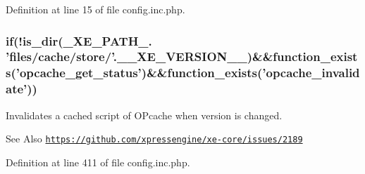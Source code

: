 Definition at line 15 of file config.\-inc.\-php.

\hypertarget{config_8inc_8php_ad290f1de8a298a2010bf8bafc4e86c0a}{
\subsubsection[{if}]{\setlength{\rightskip}{0pt plus 5cm}if(!is\-\_\-dir(\-\_\-\-X\-E\-\_\-\-P\-A\-T\-H\-\_\-. 'files/cache/store/'.{\bf \-\_\-\-\_\-\-X\-E\-\_\-\-V\-E\-R\-S\-I\-O\-N\-\_\-\-\_\-})\&\&function\-\_\-exists('opcache\-\_\-get\-\_\-status')\&\&function\-\_\-exists('opcache\-\_\-invalidate'))}}\label{config_8inc_8php_ad290f1de8a298a2010bf8bafc4e86c0a}
Invalidates a cached script of O\-Pcache when version is changed. \begin{DoxySeeAlso}{See Also}
\href{https://github.com/xpressengine/xe-core/issues/2189}{\tt https\-://github.\-com/xpressengine/xe-\/core/issues/2189} 
\end{DoxySeeAlso}


Definition at line 411 of file config.\-inc.\-php.

